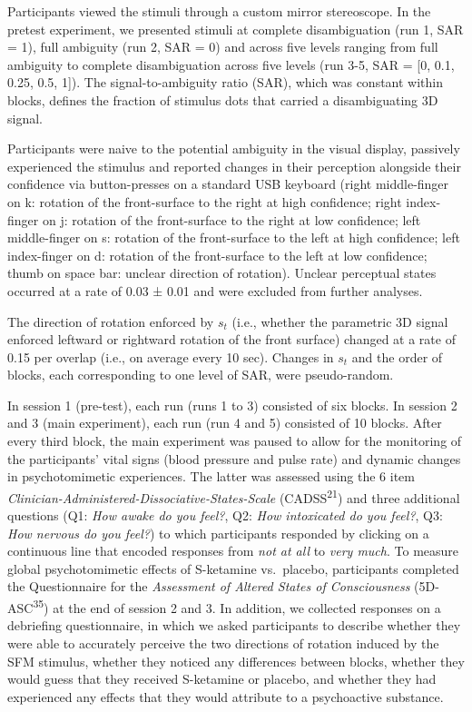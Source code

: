 \documentclass[
]{article}
\begin{document}
Participants viewed the stimuli through a custom mirror stereoscope. In
the pretest experiment, we presented stimuli at complete disambiguation
(run 1, SAR = 1), full ambiguity (run 2, SAR = 0) and across five levels
ranging from full ambiguity to complete disambiguation across five
levels (run 3-5, SAR = {[}0, 0.1, 0.25, 0.5, 1{]}). The
signal-to-ambiguity ratio (SAR), which was constant within blocks,
defines the fraction of stimulus dots that carried a disambiguating 3D
signal.

Participants were naive to the potential ambiguity in the visual
display, passively experienced the stimulus and reported changes in
their perception alongside their confidence via button-presses on a
standard USB keyboard (right middle-finger on k: rotation of the
front-surface to the right at high confidence; right index-finger on j:
rotation of the front-surface to the right at low confidence; left
middle-finger on s: rotation of the front-surface to the left at high
confidence; left index-finger on d: rotation of the front-surface to the
left at low confidence; thumb on space bar: unclear direction of
rotation). Unclear perceptual states occurred at a rate of 0.03 ± 0.01
and were excluded from further analyses.

The direction of rotation enforced by \(s_t\) (i.e., whether the
parametric 3D signal enforced leftward or rightward rotation of the
front surface) changed at a rate of 0.15 per overlap (i.e., on average
every 10 sec). Changes in \(s_t\) and the order of blocks, each
corresponding to one level of SAR, were pseudo-random.

In session 1 (pre-test), each run (runs 1 to 3) consisted of six blocks.
In session 2 and 3 (main experiment), each run (run 4 and 5) consisted
of 10 blocks. After every third block, the main experiment was paused to
allow for the monitoring of the participants' vital signs (blood
pressure and pulse rate) and dynamic changes in psychotomimetic
experiences. The latter was assessed using the 6 item
\emph{Clinician-Administered-Dissociative-States-Scale}
(CADSS\textsuperscript{21}) and three additional questions (Q1:
\emph{How awake do you feel?}, Q2: \emph{How intoxicated do you feel?},
Q3: \emph{How nervous do you feel?}) to which participants responded by
clicking on a continuous line that encoded responses from \emph{not at
all} to \emph{very much}. To measure global psychotomimetic effects of
S-ketamine vs.~placebo, participants completed the Questionnaire for the
\emph{Assessment of Altered States of Consciousness}
(5D-ASC\textsuperscript{35}) at the end of session 2 and 3. In addition,
we collected responses on a debriefing questionnaire, in which we asked
participants to describe whether they were able to accurately perceive
the two directions of rotation induced by the SFM stimulus, whether they
noticed any differences between blocks, whether they would guess that
they received S-ketamine or placebo, and whether they had experienced
any effects that they would attribute to a psychoactive substance.
\end{document}
